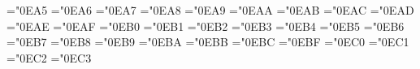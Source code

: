\let\mSpaceIndicator=\SpaceIndicator 
\mathchardef\RoundSpaceIndicator ="0EA5
\let\mRoundSpaceIndicator=\RoundSpaceIndicator 
\mathchardef\InvisiblePrefixScriptBase ="0EA6
\let\mInvisiblePrefixScriptBase=\InvisiblePrefixScriptBase 
\mathchardef\InvisiblePostfixScriptBase ="0EA7
\let\mInvisiblePostfixScriptBase=\InvisiblePostfixScriptBase 
\mathchardef\CommandKey ="0EA8
\let\mCommandKey=\CommandKey 
\mathchardef\LeftModified ="0EA9
\let\mLeftModified=\LeftModified 
\mathchardef\RightModified ="0EAA
\let\mRightModified=\RightModified 
\mathchardef\InvisibleApplication="0EAB
\let\mInvisibleApplication=\InvisibleApplication
\mathchardef\CloverLeaf ="0EAC
\let\mCloverLeaf=\CloverLeaf 
\mathchardef\ControlKey ="0EAD
\let\mControlKey=\ControlKey 
\mathchardef\ReturnIndicator ="0EAE
\let\mReturnIndicator=\ReturnIndicator 
\mathchardef\LineSeparator ="0EAF
\let\mLineSeparator=\LineSeparator 
\mathchardef\ParagraphSeparator ="0EB0
\let\mParagraphSeparator=\ParagraphSeparator 
\mathchardef\HorizontalLine ="0EB1
\let\mHorizontalLine=\HorizontalLine 
\mathchardef\InvisibleComma ="0EB2
\let\mInvisibleComma=\InvisibleComma 
\mathchardef\SelectionPlaceholder ="0EB3
\let\mSelectionPlaceholder=\SelectionPlaceholder 
\mathchardef\Placeholder ="0EB4
\let\mPlaceholder=\Placeholder 
\mathchardef\AlignmentMarker ="0EB5
\let\mAlignmentMarker=\AlignmentMarker 
\mathchardef\SkeletonIndicator ="0EB6
\let\mSkeletonIndicator=\SkeletonIndicator 
\mathchardef\LeftSkeleton ="0EB7
\let\mLeftSkeleton=\LeftSkeleton 
\mathchardef\RightSkeleton ="0EB8
\let\mRightSkeleton=\RightSkeleton 
\mathchardef\ErrorIndicator ="0EB9
\let\mErrorIndicator=\ErrorIndicator 
\mathchardef\AutoSpace ="0EBA
\let\mAutoSpace=\AutoSpace 
\mathchardef\AutoOperand ="0EBB
\let\mAutoOperand=\AutoOperand 
\mathchardef\AutoPlaceholder ="0EBC
\let\mAutoPlaceholder=\AutoPlaceholder 
\def\mAutoLeftMatch{\@unicode{AutoLeftMatch}}
\def\mAutoRightMatch{\@unicode{AutoRightMatch}}
\mathchardef\Piecewise ="0EBF
\let\mPiecewise=\Piecewise 
\mathchardef\Transpose ="0EC0
\let\mTranspose=\Transpose 
\mathchardef\Conjugate ="0EC1
\let\mConjugate=\Conjugate 
\mathchardef\HermitianConjugate ="0EC2
\let\mHermitianConjugate=\HermitianConjugate 
\mathchardef\ConjugateTranspose ="0EC3
\let\mConjugateTranspose=\ConjugateTranspose 
\def\mRawTab{\@unicode{RawTab}}
\def\mRawReturn{\@unicode{RawReturn}}
\def\mRawEscape{\@unicode{RawEscape}}
\def\mRawSpace{\@unicode{RawSpace}}
\def\mRawExclamation{\@unicode{RawExclamation}}
\def\mRawDoubleQuote{\@unicode{RawDoubleQuote}}
\def\mRawNumberSign{\@unicode{RawNumberSign}}
\def\mRawDollar{\@unicode{RawDollar}}
